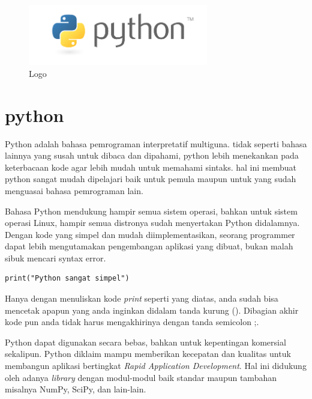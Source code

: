 
\sloppy

\begin{figure}[ht]
	\centerline{\includegraphics[width=0.70\textwidth]{figures/python}}
	\caption{Logo}
	\label{Logo}
\end{figure}

\section{python}

Python adalah bahasa pemrograman interpretatif multiguna. tidak seperti bahasa lainnya yang susah untuk dibaca dan dipahami, python lebih menekankan pada keterbacaan kode agar lebih mudah untuk memahami sintaks. hal ini membuat python sangat mudah dipelajari baik untuk pemula maupun untuk yang sudah menguasai bahasa pemrograman lain.


\par
Bahasa Python mendukung hampir semua sistem operasi, bahkan untuk sistem operasi Linux, hampir semua distronya sudah menyertakan Python didalamnya. Dengan kode yang simpel dan mudah diimplementasikan, seorang programmer dapat lebih mengutamakan pengembangan aplikasi yang dibuat, bukan malah sibuk mencari syntax error.
\begin{verbatim}
print("Python sangat simpel")
\end{verbatim}

Hanya dengan menuliskan kode \textit{print} seperti yang diatas, anda sudah bisa mencetak apapun yang anda inginkan didalam tanda kurung (). Dibagian akhir kode pun anda tidak harus mengakhirinya dengan tanda semicolon ;.

\par 
Python dapat digunakan secara bebas, bahkan untuk kepentingan komersial sekalipun. Python diklaim mampu memberikan kecepatan dan kualitas untuk membangun aplikasi bertingkat \textit{Rapid Application Development}. Hal ini didukung oleh adanya \textit{library} dengan modul-modul baik standar maupun tambahan misalnya NumPy, SciPy, dan lain-lain.

